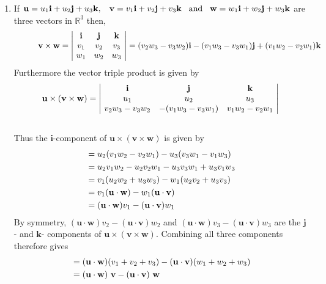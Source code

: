 \documentclass[12pt]{amsart}
\begin{document}
\begin{enumerate}
\begin{enumerate}
		\end{enumerate}
		
	\item If $\mathbf{u}=u_1\mathbf{i}+u_2\mathbf{j}+u_3\mathbf{k}, \hspace{0.3cm}\mathbf{v}=v_1\mathbf{i}		+v_2 \mathbf{j}+v_3 \mathbf{k} \hspace{0.3cm} \text{and}\hspace{0.3cm}\mathbf{w}=w_1\mathbf{i}			+w_2 \mathbf{j}+w_3 \mathbf{k}$ \hspace{0.01cm} are three vectors in $\mathbb{R}^3$ then,
		\begin{align}
			\hspace{1cm}\mathbf{v} \times \mathbf{w}= 
			\begin{vmatrix}
				\text{ } \mathbf{i}&\mathbf{j}&\mathbf{k} \text{ } \\
				\text{ } v_1	&v_2	&v_3 \text{ } \\
				\text{ } w_1&w_2&w_3 \text{ }
			\end{vmatrix}
			=(v_2w_3-v_3w_2)\mathbf{i}-(v_1w_3-v_3w_1)\mathbf{j}+(v_1w_2-v_2w_1)\mathbf{k} \notag
		\end{align}
		Furthermore the vector triple product is given by
		\begin{align}
			\mathbf{u} \times(\mathbf{v} \times \mathbf{w})=
			\begin{vmatrix}
				\text{ } \mathbf{i}&\mathbf{j}&\mathbf{k} \text{ } \\
				\text{ } u_1&u_2&u_3 \text{ } \\
				\text{ } v_2w_3-v_3w_2 &-(v_1w_3-v_3w_1)&v_1w_2-v_2w_1 \text{ }
			\end{vmatrix} \notag
		\end{align} \\
		Thus the $\mathbf{i}$-component of $\mathbf{u} \times(\mathbf{v} \times \mathbf{w})$ is given 			by
		\begin{align}
			&=u_2(v_1w_2-v_2w_1)-u_3(v_3w_1-v_1w_3) \notag \\
			&=u_2v_1w_2-u_2v_2w_1-u_3v_3w_1+u_3v_1w_3 \notag \\
			&=v_1(u_2w_2+u_3w_3)-w_1(u_2v_2+u_3v_3) \notag \\
			&=v_1(\mathbf{u}\cdot\mathbf{w})-w_1(\mathbf{u}\cdot\mathbf{v}) \notag \\
			&=(\mathbf{u}\cdot\mathbf{w})v_1-(\mathbf{u}\cdot\mathbf{v})w_1 \notag
		\end{align}
		By symmetry, $(\mathbf{u}\cdot\mathbf{w})v_2-(\mathbf{u}\cdot\mathbf{v})w_2$ and $(\mathbf{u}			\cdot\mathbf{w})v_3-(\mathbf{u}\cdot\mathbf{v})w_3$ are the $\mathbf{j}$- and $\mathbf{k}$-
		components of $\mathbf{u} \times(\mathbf{v} \times \mathbf{w})$. Combining all three components
		therefore gives
		\begin{align}
			&=(\mathbf{u}\cdot\mathbf{w})(v_1+v_2+v_3)-(\mathbf{u}\cdot\mathbf{v})(w_1+w_2+w_3)
			\notag \\
			&=(\mathbf{u}\cdot\mathbf{w})\text{ }\mathbf{v}-(\mathbf{u}\cdot\mathbf{v})\text{ } \mathbf{w}
			\notag
		\end{align} \\
						

\end{enumerate}
\end{document}
